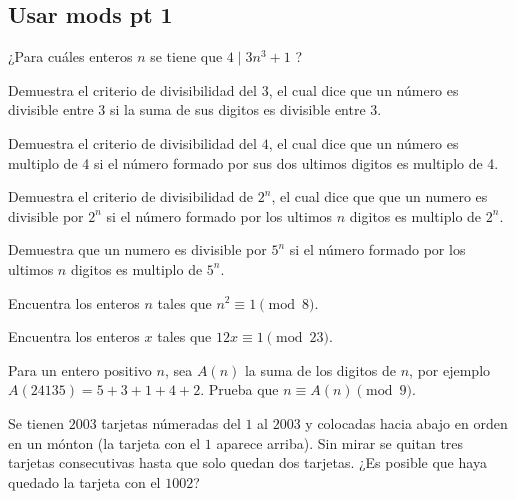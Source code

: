 \documentclass[11pt]{scrartcl}
\newcommand{\thmdifficulty}{0}
\newcommand{\problemdiff}[1]{\renewcommand{\thmdifficulty}{#1}}
\begin{document}
\newpage
\subsection{Usar mods pt 1}
\problemdiff{0}
\begin{problema}
¿Para cu\'ales enteros $n$ se tiene que $4 \mid 3n^3+1$ ?
\end{problema}

\problemdiff{0}
\begin{problema}
Demuestra el criterio de divisibilidad del $3$, el cual dice que un n\'umero es divisible entre 3 si la suma de sus digitos es divisible entre 3.
\end{problema}

\problemdiff{0}
\begin{problema}
Demuestra el criterio de divisibilidad del $4$, el cual dice que un n\'umero es multiplo de 4 si el n\'umero formado por sus dos ultimos digitos es multiplo de 4.
\end{problema}

\problemdiff{0}
\begin{problema}
Demuestra el criterio de divisibilidad de $2^n$, el cual dice que que un numero es divisible por $2^n$ si el número formado por los ultimos $n$ digitos es multiplo de $2^n$.
\end{problema}

\problemdiff{0}
\begin{problema}
Demuestra que un numero es divisible por $5^n$ si el número formado por los ultimos $n$ digitos es multiplo de $5^n$.
\end{problema}

\problemdiff{0}
\begin{problema}
Encuentra los enteros $n$ tales que $n^2 \equiv 1 \pmod 8$.
\end{problema}

\problemdiff{0}
\begin{problema}
Encuentra los enteros $x$ tales que $12x \equiv 1 \pmod{23}$.
\end{problema}

\problemdiff{0}
\begin{problema}
Para un entero positivo $n$, sea $A(n)$ la suma de los digitos de $n$, por ejemplo $A(24135)= 5 +3 +1 +4 +2$. Prueba que $n \equiv A(n) \pmod{9}$.
\end{problema}

\problemdiff{0}
\begin{problema}
Se tienen $2003$ tarjetas n\'umeradas del $1$ al $2003$ y colocadas hacia abajo en orden en un m\'onton (la tarjeta con el $1$ aparece arriba). Sin mirar se quitan tres tarjetas consecutivas hasta que solo quedan dos tarjetas. ¿Es posible que haya quedado la tarjeta con el $1002$?
\end{problema}
\end{document}
